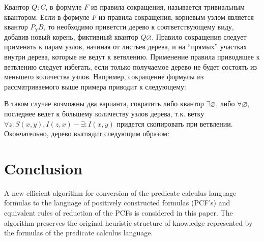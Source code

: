 \documentclass[a4paper,12pt]{article}
\begin{document}
Квантор $Q\colon C$, в формуле $F$ из правила сокращения, называется тривиальным квантором. Если в формуле $F$ из правила сокращения, корневым узлом является квантор $P_Y B$, то необходимо приветсти дерево к соответствующему виду, добавив новый корень, фиктивный квантор $Q\varnothing$. Правило сокращения следует применять к парам узлов, начиная от листьев дерева, и на ``прямых'' участках внутри дерева, которые не ведут к ветвлению. Применение правила приводящее к ветвлению следует избегать, если только получаемое дерево не будет состоять из меньшего количества узлов. Например, сокращение формулы из рассматриваемого выше примера приводит к следующему:
\begin{center}
\end{center}
В таком случае возможны два варианта, сократить либо квантор $\exists\varnothing$, либо $\forall\varnothing$, последнее ведет к большему количеству узлов дерева, т.к. ветку $\forall z\colon S(x,y),I(z,x) - \exists\colon I(x,y)$ придется скопировать при ветвлении. Окончательно, дерево выглядит следующим образом:

\begin{center}
\end{center}

\section{Conclusion}
A new efficient algorithm for conversion of the predicate calculus language formulas to the language of positively constructed formulas (PCF's) and equivalent rules of reduction of the  PCFs is considered in this paper.  The algorithm preserves the original heuristic structure of knowledge represented by the formulas of the predicate calculus language.
\end{document}
